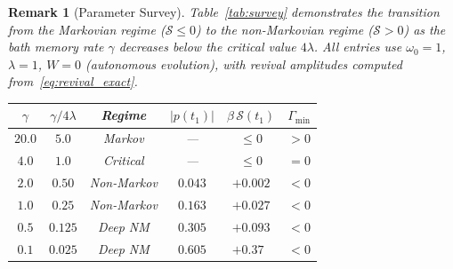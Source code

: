 \documentclass[12pt]{article}
\newtheorem{remark}[theorem]{Remark}
\begin{document}
\begin{remark}[Parameter Survey]
\label{rem:parameter_survey}
Table~\ref{tab:survey} demonstrates the transition from
the Markovian regime ($\mathcal{S} \leq 0$) to the
non-Markovian regime ($\mathcal{S} > 0$) as the bath
memory rate $\gamma$ decreases below the critical value
$4\lambda$.
All entries use $\omega_0 = 1$, $\lambda = 1$,
$W = 0$ (autonomous evolution), with revival amplitudes
computed from~\eqref{eq:revival_exact}.
\begin{center}
\begin{tabular}{@{}cccccc@{}}
\toprule
$\gamma$ & $\gamma/4\lambda$ & Regime
& $|p(t_1)|$ & $\beta\,\mathcal{S}(t_1)$
& $\Gamma_{\min}$ \\
\midrule
$20.0$ & $5.0$ & Markov & --- & $\leq 0$ & $>0$ \\
$4.0$ & $1.0$ & Critical & --- & $\leq 0$ & $= 0$ \\
$2.0$ & $0.50$ & Non-Markov & $0.043$
  & $+0.002$ & $< 0$ \\
$1.0$ & $0.25$ & Non-Markov & $0.163$
  & $+0.027$ & $< 0$ \\
$0.5$ & $0.125$ & Deep NM & $0.305$
  & $+0.093$ & $< 0$ \\
$0.1$ & $0.025$ & Deep NM & $0.605$
  & $+0.37\phantom{0}$ & $< 0$ \\
\bottomrule
\end{tabular}
\end{center}
\captionsetup{hypcap=false}%
\label{tab:survey}
\end{remark}
\end{document}
